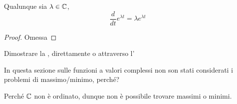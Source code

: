 \begin{proposition}
	\label{prop:deriv_exp_in_C}
	Qualunque sia $\lambda \in \mathbb{C}$,
	\[\frac{d}{dt}e^{\lambda t} = \lambda e^{\lambda t}\]
	\begin{proof}
		Omessa
	\end{proof}
\end{proposition}
\begin{exercise}
	Dimostrare la , direttamente o attraverso l'
\end{exercise}
\begin{exercise}
	In questa sezione sulle funzioni a valori complessi non son stati considerati i problemi di massimo/minimo, perché?
	\begin{solution}
		Perché $\mathbb{C}$ non è ordinato, dunque non è possibile trovare massimi o minimi.
	\end{solution}
\end{exercise}